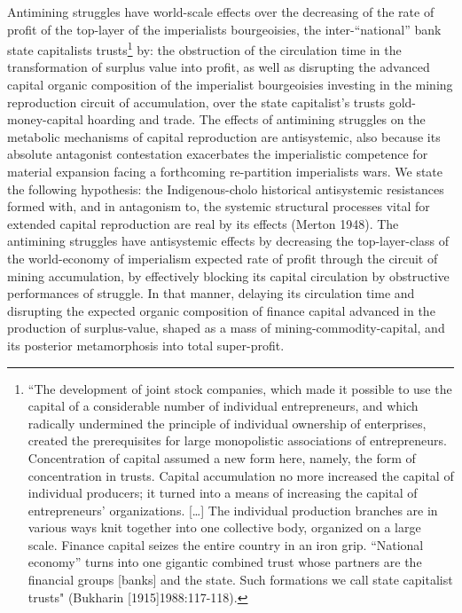 \documentclass[]{interact}
\theoremstyle{plain}%
\theoremstyle{definition}
\theoremstyle{remark}
\begin{document}
Antimining struggles have world-scale effects over the decreasing of the rate of profit of the top-layer of the imperialists bourgeoisies, the inter-“national” bank state capitalists trusts\footnote{“The development of joint  stock companies, which made it possible to use the capital of  a considerable number of individual entrepreneurs, and which  radically undermined the principle of individual ownership of  enterprises, created the prerequisites for large monopolistic associations of entrepreneurs. Concentration of capital assumed a new form here, namely, the form of concentration in trusts. Capital accumulation no more increased the capital of individual producers; it turned into a means of increasing the capital of entrepreneurs’ organizations. […] The individual  production branches are in various ways knit together into one collective body, organized on a large scale. Finance capital seizes the entire country in an iron grip. “National economy” turns into one gigantic combined trust whose partners are the financial groups [banks] and the state. Such formations we call state capitalist trusts" (Bukharin [1915]1988:117-118).} by: the obstruction of the circulation time in the transformation of surplus value into profit, as well as disrupting the advanced capital organic composition of the imperialist bourgeoisies investing in the mining reproduction circuit of accumulation, over the state capitalist’s trusts gold-money-capital hoarding and trade. The effects of antimining struggles on the metabolic mechanisms of capital reproduction are antisystemic, also because its absolute antagonist contestation exacerbates the imperialistic competence for material expansion facing a forthcoming re-partition imperialists wars.
We state the following hypothesis: the Indigenous-cholo historical antisystemic resistances formed with, and in antagonism to, the systemic structural processes vital for extended capital reproduction are real by its effects (Merton 1948). The antimining struggles have antisystemic effects by decreasing the top-layer-class of the world-economy of imperialism expected rate of profit through the circuit of mining accumulation, by effectively blocking its capital circulation by obstructive performances of struggle. In that manner, delaying its circulation time and disrupting the expected organic composition of finance capital advanced in the production of surplus-value, shaped as a mass of mining-commodity-capital, and its posterior metamorphosis into total super-profit.
\end{document}
